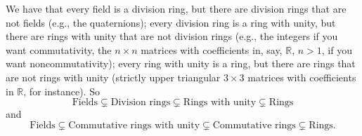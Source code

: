 \documentclass[12pt]{article}
\begin{document}
We have that every field is a division ring, but there are division rings that are not fields (e.g., the quaternions); every division ring is a ring with unity, but there are rings with unity that are not division rings (e.g., the integers if you want commutativity, the $n\times n$ matrices with coefficients in, say, $\mathbb{R}$, $n > 1$, if you want noncommutativity); every ring with unity is a ring, but there are rings that are not rings with unity (strictly upper triangular $3\times 3$ matrices with coefficients in $\mathbb{R}$, for instance). So
$$\text{Fields}\subsetneq \text{Division rings}\subsetneq \text{Rings with unity} \subsetneq \text{Rings}$$
and
$$\text{Fields}\subsetneq \text{Commutative rings with unity}\subsetneq \text{Commutative rings}\subsetneq \text{Rings}.$$

\nocite{*}
\printbibliography
\end{document}

